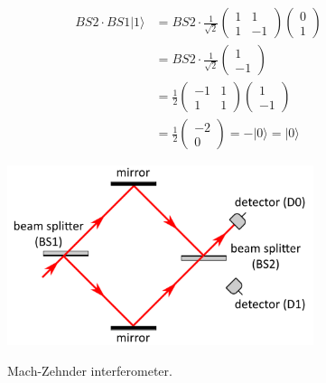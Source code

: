 \begin{equation}
\begin{aligned}
B S 2 \cdot B S 1|1\rangle &=B S 2 \cdot \frac{1}{\sqrt{2}}\left(\begin{array}{cc}
1 & 1 \\
1 & -1
\end{array}\right)\left(\begin{array}{l}
0 \\
1
\end{array}\right) \\
&=B S 2 \cdot \frac{1}{\sqrt{2}}\left(\begin{array}{c}
1 \\
-1
\end{array}\right) \\
&=\frac{1}{2}\left(\begin{array}{cc}
-1 & 1 \\
1 & 1
\end{array}\right)\left(\begin{array}{c}
1 \\
-1
\end{array}\right) \\
&=\frac{1}{2}\left(\begin{array}{c}
-2 \\
0
\end{array}\right)=-|0\rangle=|0\rangle
\end{aligned}
\end{equation}

\begin{figure}[H]
   \centering
    \includegraphics[width=0.8\textwidth]{lesson6/mach_zehnder.pdf}
    \label{fig: 1}
    \begin{center}
        \caption{Mach-Zehnder interferometer.}
    \end{center}
\end{figure}

